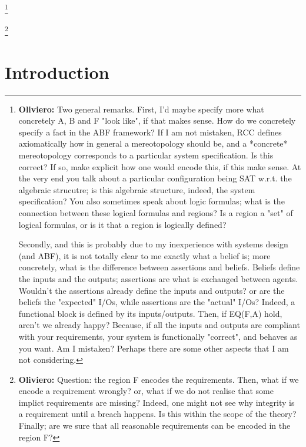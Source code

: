 \documentclass[conference]{IEEEtran}
\newcommand{\fixnote}[2]{\textbf{\color{red}{FIX}}\footnote{{\bf #1:} #2}}
\begin{document}
\fixnote{Oliviero}{Two general remarks. First, I'd maybe specify more what concretely A, B and F "look like", if that makes sense. How do we concretely specify a fact in the ABF framework? If I am not mistaken, RCC defines axiomatically how in general a mereotopology should be, and a *concrete* mereotopology corresponds to a particular system specification. Is this correct? If so, make explicit how one would encode this, if this make sense. At the very end you talk about a particular configuration being SAT w.r.t. the algebraic strucutre; is this algebraic structure, indeed, the system specification? You also sometimes speak about logic formulas; what is the connection between these logical formulas and regions? Is a region a "set" of logical formulas, or is it that a region is logically defined?

Secondly, and this is probably due to my inexperience with systems design (and ABF), it is not totally clear to me exactly what a belief is; more concretely, what is the difference between assertions and beliefs. Beliefs define the inputs and the outputs; assertions are what is exchanged between agents. Wouldn't the assertions already define the inputs and outputs? or are the beliefs the "expected" I/Os, while assertions are the "actual" I/Os? Indeed, a functional block is defined by its inputs/outputs. Then, if EQ(F,A) hold, aren't we already happy? Because, if all the inputs and outputs are compliant with your requirements, your system is functionally "correct", and behaves as you want. Am I mistaken? Perhaps there are some other aspects that I am not considering.}

\fixnote{Oliviero}{Question: the region F encodes the requirements. Then, what if we encode a requirement wrongly? or, what if we do not realise that some implict requirements are missing? Indeed, one might not see why integrity is a requirement until a breach happens. Is this within the scope of the theory? Finally; are we sure that all reasonable requirements can be encoded in the region F?}

\section{Introduction}\label{sec:intro}
\end{document}
